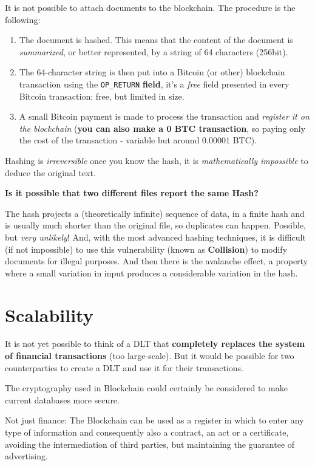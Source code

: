 It is not possible to attach documents to the blockchain. The procedure is the following:
\begin{enumerate}
	\item The document is hashed. This means that the content of the document is \textit{summarized}, or better represented, by a string of 64 characters (256bit).
	\item The 64-character string is then put into a Bitcoin (or other) blockchain transaction using the \texttt{OP\_RETURN} \textbf{field}, it's a \textit{free} field presented in every Bitcoin transaction: free, but limited in size.
	\item A small Bitcoin payment is made to process the transaction and \textit{register it on the blockchain} (\textbf{you can also make a 0 BTC transaction}, so paying only the cost of the transaction - variable but around $0.00001$ BTC).
\end{enumerate}

Hashing is \textit{irreversible} once you know the hash, it is \textit{mathematically impossible} to deduce the original text.

\textbf{Is it possible that two different files report the same Hash?}

The hash projects a (theoretically infinite) sequence of data, in a finite hash and is usually much shorter than the original file, so duplicates can happen. Possible, but \textit{very unlikely}! And, with the most advanced hashing techniques, it is difficult (if not impossible) to use this vulnerability (known as \textbf{Collision}) to modify documents for illegal purposes. And then there is the avalanche effect, a property where a small variation in input produces a considerable variation in the hash.

\section{Scalability}

It is not yet possible to think of a DLT that \textbf{completely replaces the system of financial transactions} (too large-scale). But it would be possible for two counterparties to create a DLT and use it for their transactions.

The cryptography used in Blockchain could certainly be considered to make current databases more secure.

Not just finance: The Blockchain can be used as a register in which to enter any type of information and consequently also a contract, an act or a certificate, avoiding the intermediation of third parties, but maintaining the guarantee of advertising.

